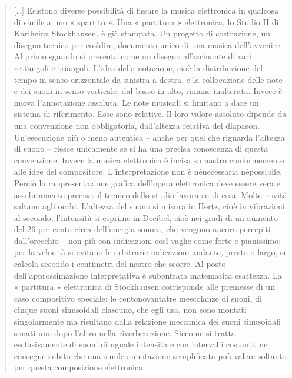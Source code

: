 \begin{quote}
	[\ldots] Esistono diverse possibilità di fissare la musica elettronica in qualcosa di simile a uno « spartito ». Una « partitura » elettronica, lo Studio II di Karlheinz Stockhausen, è già stampata. Un progetto di costruzione, un disegno tecnico per cosìdire, documento unico di una musica dell’avvenire. Al primo sguardo si presenta come un disegno affascinante di vari rettangoli e triangoli.
	L’idea della notazione, cioè la distribuzione del tempo in senso orizzontale da sinistra a destra, e la collocazione delle note e dei suoni in senso verticale, dal basso in alto, rimane inalterata. Invece è nuova l’annotazione assoluta. Le note musicali si limitano a dare un sistema di riferimento. Esse sono relative. Il loro valore assoluto dipende da una convenzione non obbligatoria, dall’altezza relativa del diapason. Un’esecuzione più o meno autentica – anche per quel che riguarda l’altezza di suono – riesce unicamente se si ha una precisa conoscenza di questa convenzione. Invece la musica elettronica è incisa su nastro conformemente alle idee del compositore. L’interpretazione non è nénecessaria népossibile. Perciò la rappresentazione grafica dell’opera elettronica deve essere vera e assolutamente precisa: il tecnico dello studio lavora su di essa. Molte novità saltano agli occhi. L’altezza del suono si misura in Hertz, cioè in vibrazioni al secondo; l’intensità si esprime in Decibel, cioè nei gradi di un aumento del 26 per cento circa dell’energia sonora, che vengono ancora percepiti dall’orecchio – non più con indicazioni così vaghe come forte e pianissimo; per la velocità si evitano le arbitrarie indicazioni andante, presto o largo, si calcola secondo i centimetri del nastro che scorre. Al posto dell’approssimazione interpretativa è subentrata matematica esattezza. La « partitura » elettronica di Stockhausen corrisponde alle premesse di un caso compositivo speciale: le centonovantatre mescolanze di suoni, di cinque suoni sinusoidali ciascuno, che egli usa, non sono montati singolarmente ma risultano dalla relazione meccanica dei suoni sinusoidali sonati uno dopo l’altro nella riverberazione. Siccome si tratta esclusivamente di suoni di uguale intensità e con intervalli costanti, ne consegue subito che una simile annotazione semplificata può valere soltanto per questa composizione elettronica.


\end{quote}
